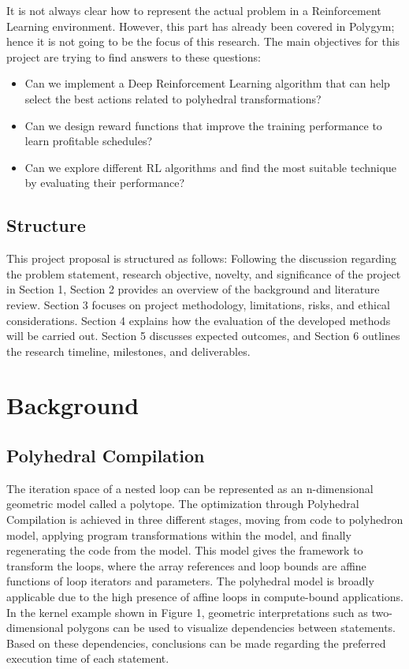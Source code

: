 \documentclass[logo,msc]{infthesis}           %
\begin{document}
It is not always clear how to represent the actual problem in a Reinforcement Learning environment. However, this part has already been covered in Polygym\cite{9563041}; hence it is not going to be the focus of this research. The main objectives for this project are trying to find answers to these questions:
\begin{itemize}

    \item Can we implement a Deep Reinforcement Learning algorithm that can help select the best actions related to polyhedral transformations? 
    \item Can we design reward functions that improve the training performance to learn profitable schedules?
    \item Can we explore different RL algorithms and find the most suitable technique by evaluating their performance?


\end{itemize}

\section{Structure}

This project proposal is structured as follows: Following the discussion regarding the problem statement, research objective, novelty, and significance of the project in Section 1, Section 2 provides an overview of the background and literature review. Section 3 focuses on project methodology, limitations, risks, and ethical considerations. Section 4 explains how the evaluation of the developed methods will be carried out. Section 5 discusses expected outcomes, and Section 6 outlines the research timeline, milestones, and deliverables.

\chapter{Background}

\section{Polyhedral Compilation}

The iteration space of a nested loop can be represented as an n-dimensional geometric model called a polytope. The optimization through Polyhedral Compilation is achieved in three different stages, moving from code to polyhedron model, applying program transformations within the model, and finally regenerating the code from the model. This model gives the framework to transform the loops, where the array references and loop bounds are affine functions of loop iterators and parameters. The polyhedral model is broadly applicable due to the high presence of affine loops in compute-bound applications\cite{poly_applicable}. In the kernel example shown in Figure 1, geometric interpretations such as two-dimensional polygons can be used to visualize dependencies between statements. Based on these dependencies, conclusions can be made regarding the preferred execution time of each statement. 
\end{document}
